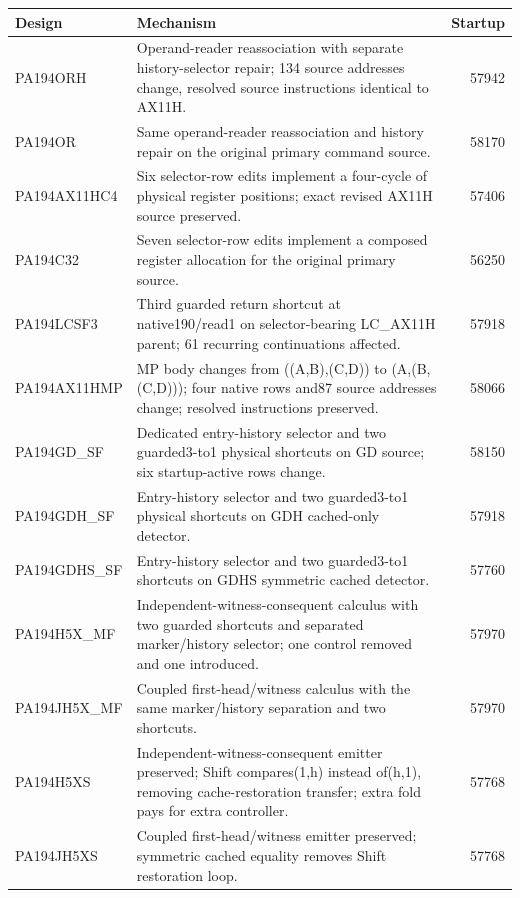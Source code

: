 \begingroup\small
\begin{longtable}{L{34mm}L{90mm}r}
\toprule
Design & Mechanism & Startup\\
\midrule\endhead
PA194ORH & Operand-reader reassociation with separate history-selector repair; 134 source addresses change, resolved source instructions identical to AX11H. & 57942\\[3pt]
PA194OR & Same operand-reader reassociation and history repair on the original primary command source. & 58170\\[3pt]
PA194AX11HC4 & Six selector-row edits implement a four-cycle of physical register positions; exact revised AX11H source preserved. & 57406\\[3pt]
PA194C32 & Seven selector-row edits implement a composed register allocation for the original primary source. & 56250\\[3pt]
PA194LCSF3 & Third guarded return shortcut at native190/read1 on selector-bearing LC\_AX11H parent; 61 recurring continuations affected. & 57918\\[3pt]
PA194AX11HMP & MP body changes from ((A,B),(C,D)) to (A,(B,(C,D))); four native rows and87 source addresses change; resolved instructions preserved. & 58066\\[3pt]
PA194GD\_SF & Dedicated entry-history selector and two guarded3-to1 physical shortcuts on GD source; six startup-active rows change. & 58150\\[3pt]
PA194GDH\_SF & Entry-history selector and two guarded3-to1 physical shortcuts on GDH cached-only detector. & 57918\\[3pt]
PA194GDHS\_SF & Entry-history selector and two guarded3-to1 shortcuts on GDHS symmetric cached detector. & 57760\\[3pt]
PA194H5X\_MF & Independent-witness-consequent calculus with two guarded shortcuts and separated marker/history selector; one control removed and one introduced. & 57970\\[3pt]
PA194JH5X\_MF & Coupled first-head/witness calculus with the same marker/history separation and two shortcuts. & 57970\\[3pt]
PA194H5XS & Independent-witness-consequent emitter preserved; Shift compares(1,h) instead of(h,1), removing cache-restoration transfer; extra fold pays for extra controller. & 57768\\[3pt]
PA194JH5XS & Coupled first-head/witness emitter preserved; symmetric cached equality removes Shift restoration loop. & 57768\\[3pt]
\bottomrule
\end{longtable}
\endgroup
